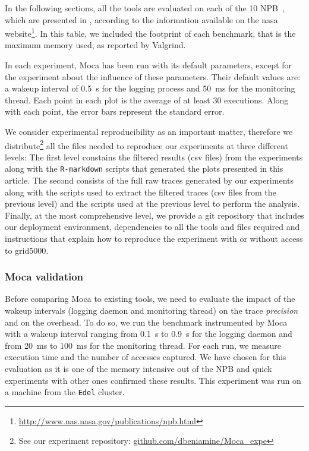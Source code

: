 In the following sections, all the tools are
evaluated on each of the 10 \gls{NPB}~\cite{Jin1999}, which are
presented in , according to the information available on the nasa
website\footnote{\url{http://www.nas.nasa.gov/publications/npb.html}}. In this table, we included the footprint of each benchmark, that is the maximum memory
used, as reported by Valgrind.

In each experiment,
\gls{Moca} has been run with its default parameters,
except for the experiment about the influence of these parameters.
Their default values are: a wakeup interval of
\SI{0.5}{s} for the logging process and \SI{50}{ms} for the monitoring thread.
Each point in each plot is the average of at least $30$ executions. Along with each point,
the error bars represent the standard error.

We consider experimental reproducibility as an important matter, therefore we
distribute\footnote{See our experiment repository:
    \href{https://github.com/dbeniamine/Moca_expe}{github.com/dbeniamine/Moca\_expe}}
all the files needed to reproduce our experiments at three different levels:
The first level constains the filtered results (csv files) from the
experiments along with the \texttt{R-markdown} scripts that generated the
plots presented in this article.
The second consists of the full raw traces generated by our experiments along
with the scripts used to extract the filtered traces (csv files from the
previous level) and the scripts used at the previous level to perform the
analysis.
Finally, at the most comprehensive level, we provide a git repository that
includes our deployment environment, dependencies to all the tools and files
required and instructions that explain how to reproduce the experiment with or
without access to grid5000.


\subsubsection{Moca validation}
\label{sec:expe-param}

Before comparing \gls{Moca} to existing tools, we need to evaluate the impact of
the wakeup intervals (logging daemon and monitoring thread) on the trace
\emph{precision} and on the overhead. To do so, we run the \IS benchmark instrumented by \gls{Moca} with
a wakeup interval ranging from \SI{0.1}{s} to  \SI{0.9}{s} for the logging daemon and from \SI{20}{ms} to
\SI{100}{ms} for the monitoring thread. For each run, we measure \IS execution time and the number of
accesses captured. We have chosen \IS for this evaluation as it is one of the memory intensive out of the \gls{NPB}
and quick experiments with other ones confirmed these results. This experiment was
run on a machine from the \texttt{Edel} cluster.

